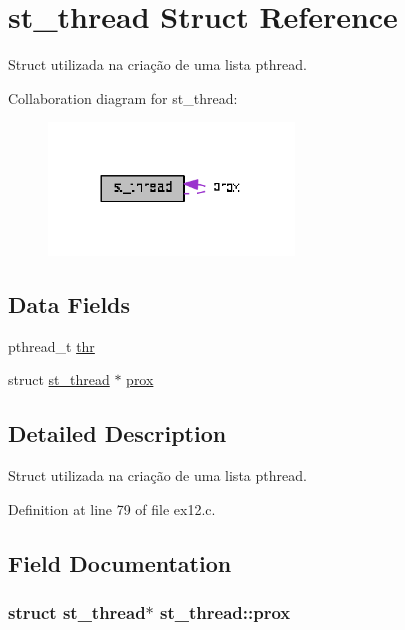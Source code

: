 \hypertarget{structst__thread}{\section{st\+\_\+thread Struct Reference}
\label{structst__thread}
}


Struct utilizada na criação de uma lista pthread.  




Collaboration diagram for st\+\_\+thread\+:\nopagebreak
\begin{figure}[H]
\begin{center}
\leavevmode
\includegraphics[width=185pt]{structst__thread__coll__graph}
\end{center}
\end{figure}
\subsection*{Data Fields}
\begin{DoxyCompactItemize}
\item 
pthread\+\_\+t \hyperlink{structst__thread_a33fbd41433c488aeecd687625196d115}{thr}
\item 
struct \hyperlink{structst__thread}{st\+\_\+thread} $\ast$ \hyperlink{structst__thread_aa4a7a171525a32aa2e9244112bfc0889}{prox}
\end{DoxyCompactItemize}


\subsection{Detailed Description}
Struct utilizada na criação de uma lista pthread. 



Definition at line 79 of file ex12.\+c.



\subsection{Field Documentation}
\hypertarget{structst__thread_aa4a7a171525a32aa2e9244112bfc0889}{
\subsubsection[{prox}]{\setlength{\rightskip}{0pt plus 5cm}struct {\bf st\+\_\+thread}$\ast$ st\+\_\+thread\+::prox}}\label{structst__thread_aa4a7a171525a32aa2e9244112bfc0889}


